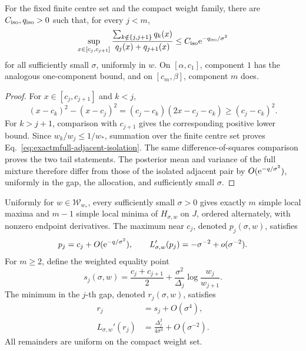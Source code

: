 \begin{lemma}
\label{lem:exactmfull-adjacent-isolation}
For the fixed finite centre set and the compact weight family, there are
\(C_{\rm iso},q_{\rm iso}>0\) such that, for every \(j<m\),
\begin{equation}
 \sup_{x\in[c_j,c_{j+1}]}
 \frac{\sum_{k\notin\{j,j+1\}}q_k(x)}
      {q_j(x)+q_{j+1}(x)}
 \le C_{\rm iso}\mathrm e^{-q_{\rm iso}/\sigma^2}
 \label{eq:exactmfull-adjacent-isolation}
\end{equation}
for all sufficiently small \(\sigma\), uniformly in \(w\).  On
\([\alpha,c_1]\), component \(1\) has the analogous one-component bound, and
on \([c_m,\beta]\), component \(m\) does.
\end{lemma}

\begin{proof}
For \(x\in[c_j,c_{j+1}]\) and \(k<j\),
\begin{equation}
 (x-c_k)^2-(x-c_j)^2
 =(c_j-c_k)(2x-c_j-c_k)\ge(c_j-c_k)^2.
 \label{eq:exactmfull-left-square-comparison}
\end{equation}
For \(k>j+1\), comparison with \(c_{j+1}\) gives the corresponding positive
lower bound.  Since \(w_k/w_j\le1/w_*\), summation over the finite centre set
proves Eq.~\eqref{eq:exactmfull-adjacent-isolation}.  The same
difference-of-squares comparison proves the two tail statements.  The
posterior mean and variance of the full mixture therefore differ from those
of the isolated adjacent pair by \(O(\mathrm e^{-q/\sigma^2})\), uniformly in the
gap, the allocation, and sufficiently small \(\sigma\).
\end{proof}

\begin{theorem}
\label{thm:exactmfull-pure-topology}
Uniformly for \(w\in\mathcal W_{w_*}\), every sufficiently small
\(\sigma>0\) gives exactly \(m\) simple local maxima and \(m-1\) simple local
minima of \(H_{\sigma,w}\) on \(J\), ordered alternately, with nonzero
endpoint derivatives.  The maximum near \(c_j\), denoted \(p_j(\sigma,w)\),
satisfies
\begin{equation}
 p_j=c_j+O(\mathrm e^{-q/\sigma^2}),
 \qquad L_{\sigma,w}'(p_j)
 =-\sigma^{-2}+o(\sigma^{-2}).
 \label{eq:exactmfull-peak-location}
\end{equation}
For \(m\ge2\), define the weighted equality point
\begin{equation}
 s_j(\sigma,w)
 =\frac{c_j+c_{j+1}}2
  +\frac{\sigma^2}{\Delta_j}\log\frac{w_j}{w_{j+1}}.
 \label{eq:exactmfull-weighted-crossover}
\end{equation}
The minimum in the \(j\)-th gap, denoted \(r_j(\sigma,w)\), satisfies
\begin{align}
 r_j&=s_j+O(\sigma^4),
 \label{eq:exactmfull-valley-location}\\
 L_{\sigma,w}'(r_j)
 &=\frac{\Delta_j^2}{4\sigma^4}+O(\sigma^{-2}).
 \label{eq:exactmfull-valley-curvature}
\end{align}
All remainders are uniform on the compact weight set.
\end{theorem}

